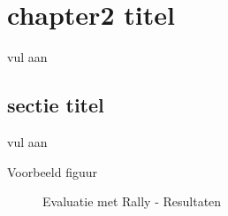 \chapter{chapter2 titel}
\label{chap:evaluation}

vul aan

\section{sectie titel}
\label{sec:scalable_faafo}
vul aan

Voorbeeld figuur
\begin{figure}
	\centering
	\par\medskip
	\caption{Evaluatie met Rally - Resultaten}
	\label{fig:evaluation_rally}
\end{figure}

